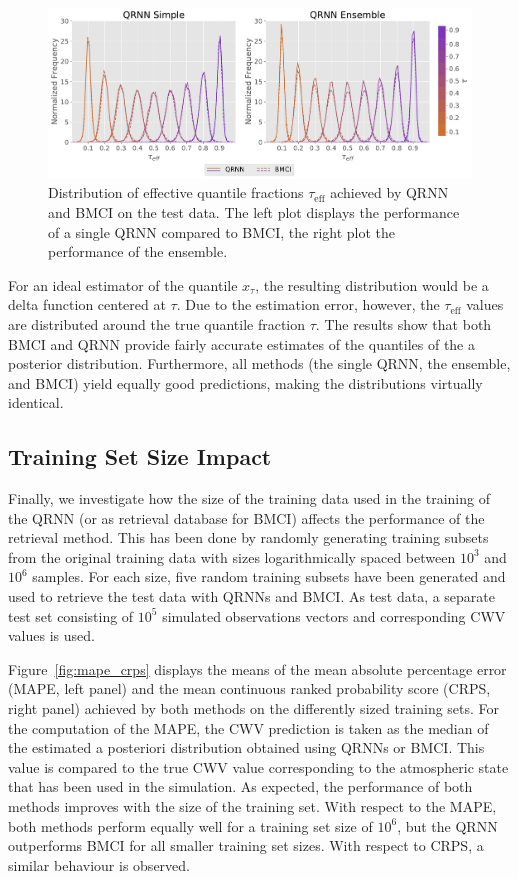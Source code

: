 \documentclass[journal abbreviation, manuscript]{copernicus}
\begin{document}
  \begin{figure}[hbpt!]
    \centering
    \includegraphics[width = 0.8\linewidth]{../plots/quantile_fractions}
    \caption{Distribution of effective quantile fractions $\tau_\text{eff}$ achieved by
      QRNN and BMCI on the test data. The left plot displays the performance of a
      single QRNN compared to BMCI, the right plot the performance of the ensemble.}
    \label{fig:quantile_fractions}
  \end{figure}

  For an ideal estimator of the quantile $x_\tau$, the resulting distribution
  would be a delta function centered at $\tau$. Due to the estimation error,
  however, the $\tau_{\text{eff}}$ values are distributed around the true quantile
  fraction $\tau$. The results show that both BMCI and QRNN provide fairly
  accurate estimates of the quantiles of the a posterior distribution. Furthermore,
  all methods (the single QRNN, the ensemble, and BMCI) yield equally good predictions,
  making the distributions virtually identical.

\subsection{Training Set Size Impact}

Finally, we investigate how the size of the training data used in the training
of the QRNN (or as retrieval database for BMCI) affects the performance of the
retrieval method. This has been done by randomly generating training subsets
from the original training data with sizes logarithmically spaced between $10^3$
and $10^6$ samples. For each size, five random training subsets have been
generated and used to retrieve the test data with QRNNs and BMCI. As test data,
a separate test set consisting of $10^5$ simulated observations vectors and
corresponding CWV values is used.

Figure~\ref{fig:mape_crps} displays the means of the mean absolute percentage
error (MAPE, left panel) and the mean continuous ranked probability score (CRPS,
right panel) achieved by both methods on the differently sized training sets.
For the computation of the MAPE, the CWV prediction is taken as the median of
the estimated a posteriori distribution obtained using QRNNs or BMCI. This value
is compared to the true CWV value corresponding to the atmospheric state that
has been used in the simulation. As expected, the performance of both methods
improves with the size of the training set. With respect to the MAPE, both
methods perform equally well for a training set size of $10^6$, but the QRNN
outperforms BMCI for all smaller training set sizes. With respect to CRPS, a
similar behaviour is observed.
\end{document}
